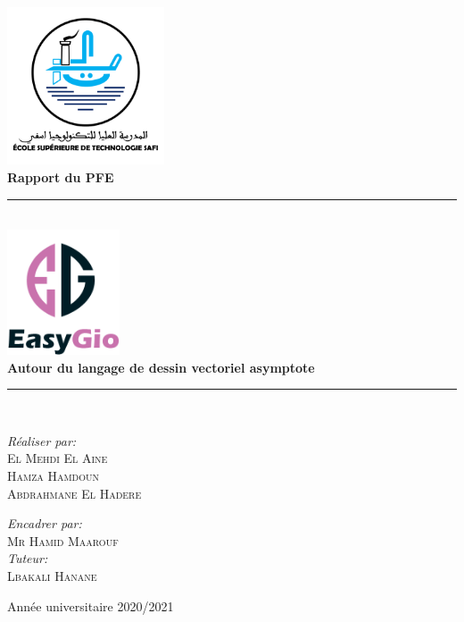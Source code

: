 \documentclass[a4paper]{report}
\newcommand{\HRule}{\rule{\linewidth}{0.5mm}}
\begin{document}
\begin{titlepage}
\begin{center}

\includegraphics[width=0.35\textwidth]{./images/ESTS_logo.png}~\\[2cm]
{\huge \bfseries Rapport du PFE}\\[0.4cm]
\HRule \\[0.4cm]
{\huge \bfseries \includegraphics[width=0.25\textwidth]{./images/logo.png}~\\[0.5cm]
Autour du langage de dessin vectoriel asymptote} \\[0.4cm]
\HRule \\[1.5cm]
\begin{minipage}{0.4\textwidth}
\begin{flushleft} \large
\emph{Réaliser par:}\\
\textsc{El Mehdi El Aine}\\
\textsc{Hamza Hamdoun}\\
\textsc{Abdrahmane El Hadere}\\
\end{flushleft}
\end{minipage}
\begin{minipage}{0.4\textwidth}
\begin{flushright} \large
\emph{Encadrer par:} \\
\textsc{Mr Hamid Maarouf}\\
\emph{Tuteur:} \\
\textsc{Lbakali Hanane}\\
\end{flushright}
\end{minipage}
\vfill
{\large Année universitaire 2020/2021}
\end{center}
\end{titlepage}
\end{document}
